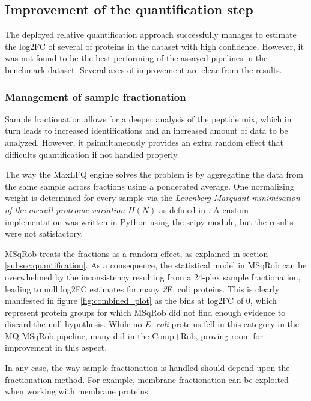 \subsection{Improvement of the quantification step}

The deployed relative quantification approach successfully manages to estimate the \ac{log2FC} of several of proteins in the dataset with high confidence. However, it was not found to be the best performing of the assayed pipelines in the benchmark dataset. Several axes of improvement are clear from the results.

\subsubsection{Management of sample fractionation}

Sample fractionation allows for a deeper analysis of the peptide mix, which in turn leads to increased identifications and an increased amount of data to be analyzed. However, it psimultaneously provides an extra random effect that difficults quantification if not handled properly.

The way the MaxLFQ engine solves the problem is by aggregating the data from the same sample across fractions using a ponderated average. One normalizing weight is determined for every sample via the \textit{Levenberg-Marquant minimisation of the overall proteome variation} $H(N)$ as defined in \cite{Cox2014}. A custom implementation was written in Python using the scipy module, but the results were not satisfactory.

MSqRob treats the fractions as a random effect, as explained in section \ref{subsec:quantification}. As a consequence, the statistical model in MSqRob can be overwhelmed by the inconsistency resulting from a 24-plex sample fractionation, leading to null \ac{log2FC} estimates for many \textit2{E. coli} proteins. This is clearly manifested in figure \ref{fig:combined_plot} as the bins at \ac{log2FC} of 0, which represent protein groups for which MSqRob did not find enough evidence to discard the null hypothesis. While no \textit{E. coli} proteins fell in this category in the MQ-MSqRob pipeline, many did in the Comp+Rob, proving room for improvement in this aspect.

In any case, the way sample fractionation is handled should depend upon the fractionation method. For example, membrane fractionation can be exploited when working with membrane proteins \cite{Marmagne2006}.

